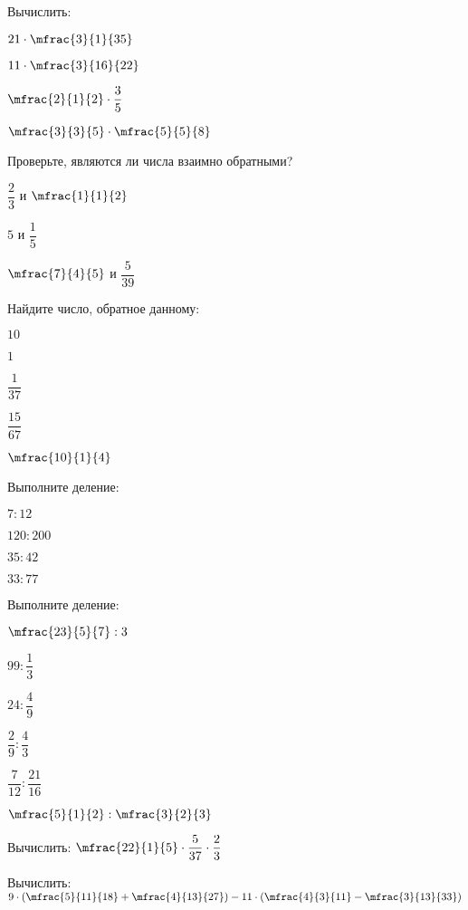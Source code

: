 \begin{homework}[number=1]
	\begin{listofex}
		\item Вычислить:
		\begin{enumcols}[itemcolumns=4]
			\item \( 21\cdot\mfrac{3}{1}{35} \)
			\item \( 11\cdot\mfrac{3}{16}{22} \)
			\item \( \mfrac{2}{1}{2}\cdot\dfrac{3}{5} \)
			\item \( \mfrac{3}{3}{5}\cdot\mfrac{5}{5}{8} \)
		\end{enumcols}
		\item Проверьте, являются ли числа взаимно обратными?
		\begin{enumcols}[itemcolumns=3]
			\item \( \dfrac{2}{3} \) и \( \mfrac{1}{1}{2} \)
			\item \( 5 \) и \( \dfrac{1}{5} \)
			\item \( \mfrac{7}{4}{5} \) и \( \dfrac{5}{39} \)
		\end{enumcols}
		\item Найдите число, обратное данному:
		\begin{enumcols}[itemcolumns=5]
			\item \( 10 \)
			\item \( 1 \)
			\item \( \dfrac{1}{37} \)
			\item \( \dfrac{15}{67} \)
			\item \( \mfrac{10}{1}{4} \)
		\end{enumcols}
		\item Выполните деление:
		\begin{enumcols}[itemcolumns=4]
			\item \( 7:12 \)
			\item \( 120:200 \)
			\item \( 35:42 \)
			\item \( 33:77 \)
		\end{enumcols}
		\item Выполните деление:
		\begin{enumcols}[itemcolumns=6]
			\item \( \mfrac{23}{5}{7}:3 \)
			\item \( 99:\dfrac{1}{3} \)
			\item \( 24:\dfrac{4}{9} \)
			\item \( \dfrac{2}{9}:\dfrac{4}{3} \)
			\item \( \dfrac{7}{12}:\dfrac{21}{16} \)
			\item \( \mfrac{5}{1}{2}:\mfrac{3}{2}{3} \)
		\end{enumcols}
		\item Вычислить: \( \mfrac{22}{1}{5}\cdot\dfrac{5}{37}\cdot\dfrac{2}{3} \)
		\item Вычислить: \( 9\cdot\left( \mfrac{5}{11}{18}+\mfrac{4}{13}{27} \right) - 11\cdot\left( \mfrac{4}{3}{11}-\mfrac{3}{13}{33} \right) \)
	\end{listofex}
\end{homework}
